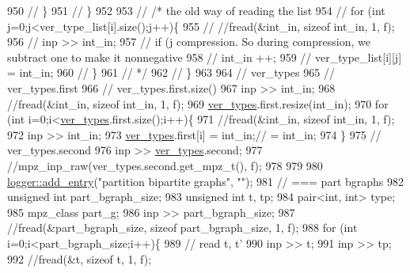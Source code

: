 \begin{DoxyCode}
950   \textcolor{comment}{//     \}}
951   \textcolor{comment}{//   \}}
952 
953   \textcolor{comment}{//   /* the old way of reading the list}
954   \textcolor{comment}{//   for (int j=0;j<ver\_type\_list[i].size();j++)\{}
955   \textcolor{comment}{//     //fread(&int\_in, sizeof int\_in, 1, f);}
956   \textcolor{comment}{//     inp >> int\_in;}
957   \textcolor{comment}{//     if (j%
       compression. So during compression, we subtract one to make it nonnegative}
958   \textcolor{comment}{//       int\_in ++;}
959   \textcolor{comment}{//     ver\_type\_list[i][j] = int\_in;}
960   \textcolor{comment}{//   \}}
961   \textcolor{comment}{//   */}
962   \textcolor{comment}{// \}}
963 
964   \textcolor{comment}{// ver\_types}
965   \textcolor{comment}{// ver\_types.first}
966   \textcolor{comment}{// ver\_types.first.size()}
967   inp >> int\_in;
968   \textcolor{comment}{//fread(&int\_in, sizeof int\_in, 1, f);}
969   \hyperlink{classmarked__graph__compressed_af446cc5e23c241a92b76642fd5ebc403}{ver\_types}.first.resize(int\_in);
970   \textcolor{keywordflow}{for} (\textcolor{keywordtype}{int} i=0;i<\hyperlink{classmarked__graph__compressed_af446cc5e23c241a92b76642fd5ebc403}{ver\_types}.first.size();i++)\{
971     \textcolor{comment}{//fread(&int\_in, sizeof int\_in, 1, f);}
972     inp >> int\_in;
973     \hyperlink{classmarked__graph__compressed_af446cc5e23c241a92b76642fd5ebc403}{ver\_types}.first[i] = int\_in;\textcolor{comment}{// = int\_in;}
974   \}
975   \textcolor{comment}{// ver\_types.second}
976   inp >> \hyperlink{classmarked__graph__compressed_af446cc5e23c241a92b76642fd5ebc403}{ver\_types}.second;
977   \textcolor{comment}{//mpz\_inp\_raw(ver\_types.second.get\_mpz\_t(), f);}
978 
979 
980   \hyperlink{classlogger_a710163deb17bc81f70d53d285b8ac9ac}{logger::add\_entry}(\textcolor{stringliteral}{"partition bipartite graphs"}, \textcolor{stringliteral}{""});
981   \textcolor{comment}{// === part bgraphs}
982   \textcolor{keywordtype}{unsigned} \textcolor{keywordtype}{int} part\_bgraph\_size;
983   \textcolor{keywordtype}{unsigned} \textcolor{keywordtype}{int} t, tp;
984   pair<int, int> type; 
985   mpz\_class part\_g;
986   inp >> part\_bgraph\_size;
987   \textcolor{comment}{//fread(&part\_bgraph\_size, sizeof part\_bgraph\_size, 1, f);}
988   \textcolor{keywordflow}{for} (\textcolor{keywordtype}{int} i=0;i<part\_bgraph\_size;i++)\{
989     \textcolor{comment}{// read t, t'}
990     inp >> t;
991     inp >> tp;
992     \textcolor{comment}{//fread(&t, sizeof t, 1, f);}

\end{DoxyCode}
